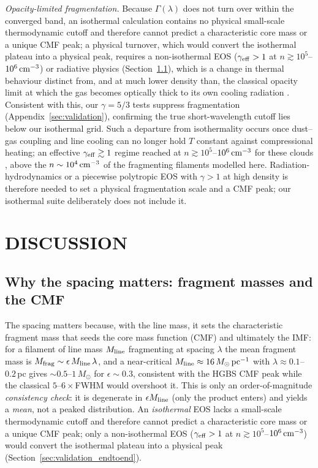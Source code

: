 \documentclass[usenatbib,twoside,twocolumn]{mnras}
\begin{document}
\emph{Opacity-limited fragmentation.} Because $\Gamma(\lambda)$ does not turn over within the converged band, an isothermal calculation contains no physical small-scale thermodynamic cutoff and therefore cannot predict a characteristic core mass or a unique CMF peak; a physical turnover, which would convert the isothermal plateau into a physical peak, requires a non-isothermal EOS ($\gamma_{\rm eff}>1$ at $n\gtrsim10^{5}$--$10^{6}\,{\rm cm^{-3}}$) or radiative physics (Section~\ref{sec:cmf}), which is a change in thermal behaviour distinct from, and at much lower density than, the classical opacity limit at which the gas becomes optically thick to its own cooling radiation \citep{Rees1976,LowLyndenBell1976}. Consistent with this, our $\gamma=5/3$ tests suppress fragmentation (Appendix~\ref{sec:validation}), confirming the true short-wavelength cutoff lies below our isothermal grid. Such a departure from isothermality occurs once dust--gas coupling and line cooling can no longer hold $T$ constant against compressional heating; an effective $\gamma_{\rm eff}\gtrsim1$ regime reached at $n\gtrsim10^{5}$--$10^{6}\,{\rm cm^{-3}}$ for these clouds \citep{Larson1985,Glover2012}, above the $n\sim10^{4}\,{\rm cm^{-3}}$ of the fragmenting filaments modelled here. Radiation-hydrodynamics or a piecewise polytropic EOS with $\gamma>1$ at high density is therefore needed to set a physical fragmentation scale and a CMF peak; our isothermal suite deliberately does not include it.

\section{DISCUSSION}
\label{sec:discussion}

\subsection{Why the spacing matters: fragment masses and the CMF}
\label{sec:cmf}
The spacing matters because, with the line mass, it sets the characteristic fragment mass that seeds the core mass function (CMF) and ultimately the IMF: for a filament of line mass $M_{\rm line}$ fragmenting at spacing $\lambda$ the mean fragment mass is $M_{\rm frag}\sim\epsilon\,M_{\rm line}\,\lambda$, and a near-critical $M_{\rm line}\approx16\,M_\odot\,{\rm pc^{-1}}$ with $\lambda\approx0.1$--$0.2$\,pc gives $\sim0.5$--$1\,M_\odot$ for $\epsilon\sim0.3$, consistent with the HGBS CMF peak while the classical $5$--$6\times$FWHM would overshoot it. This is only an order-of-magnitude \emph{consistency check}: it is degenerate in $\epsilon M_{\rm line}$ (only the product enters) and yields a \emph{mean}, not a peaked distribution. An \emph{isothermal} EOS lacks a small-scale thermodynamic cutoff and therefore cannot predict a characteristic core mass or a unique CMF peak; only a non-isothermal EOS ($\gamma_{\rm eff}>1$ at $n\gtrsim10^{5}$--$10^{6}\,{\rm cm^{-3}}$) would convert the isothermal plateau into a physical peak (Section~\ref{sec:validation_endtoend}).
\end{document}
